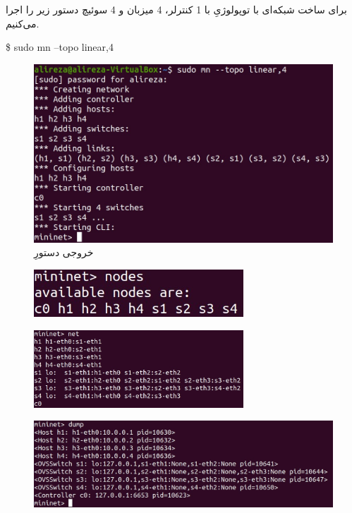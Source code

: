 \documentclass{article}
\begin{document}
\subsubsection{}
برای ساخت شبکه‌ای با توپولوژیِ  با 1 کنترلر، 4 میزبان و 4 سوئیچ دستور زیر را اجرا می‌کنیم.
\begin{latin}
\$ sudo mn --topo linear,4
\end{latin}
\begin{figure}[H]
    \centering
    \includegraphics[width=1.0\textwidth]{figures/3e.jpg}
    \caption
	{
خروجی دستورِ 
	}
    \label{fig:fig1}
\end{figure}
\begin{figure}[H]
    \centering
    \includegraphics[width=0.7\textwidth]{figures/3e1.jpg}
    \caption
	{
	}
    \label{fig:fig1}
\end{figure}
\begin{figure}[H]
    \centering
    \includegraphics[width=0.7\textwidth]{figures/3e2.jpg}
    \caption
	{
	}
    \label{fig:fig1}
\end{figure}
\begin{figure}[H]
    \centering
    \includegraphics[width=1.0\textwidth]{figures/3e3.jpg}
    \caption
	{
	}
    \label{fig:fig1}
\end{figure}
\end{document}
